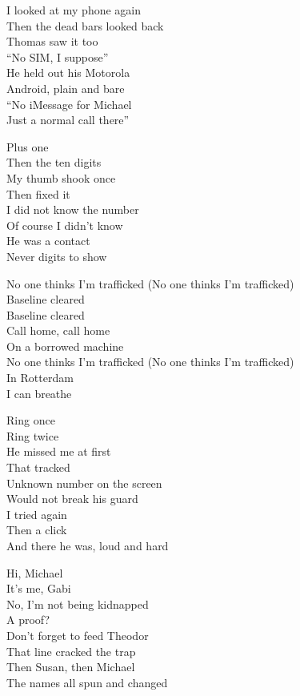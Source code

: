 \begin{lyrics}
I looked at my phone again\\
Then the dead bars looked back\\
Thomas saw it too\\
“No SIM, I suppose”\\
He held out his Motorola\\
Android, plain and bare\\
“No iMessage for Michael\\
Just a normal call there”

Plus one\\
Then the ten digits\\
My thumb shook once\\
Then fixed it\\
I did not know the number\\
Of course I didn’t know\\
He was a contact\\
Never digits to show

No one thinks I’m trafficked
(No one thinks I’m trafficked)\\
Baseline cleared\\
Baseline cleared\\
Call home, call home\\
On a borrowed machine\\
No one thinks I’m trafficked
(No one thinks I’m trafficked)\\
In Rotterdam\\
I can breathe

Ring once\\
Ring twice\\
He missed me at first\\
That tracked\\
Unknown number on the screen\\
Would not break his guard\\
I tried again\\
Then a click\\
And there he was, loud and hard

Hi, Michael\\
It’s me, Gabi\\
No, I’m not being kidnapped\\
A proof?\\
Don’t forget to feed Theodor\\
That line cracked the trap\\
Then Susan, then Michael\\
The names all spun and changed


\end{lyrics}
